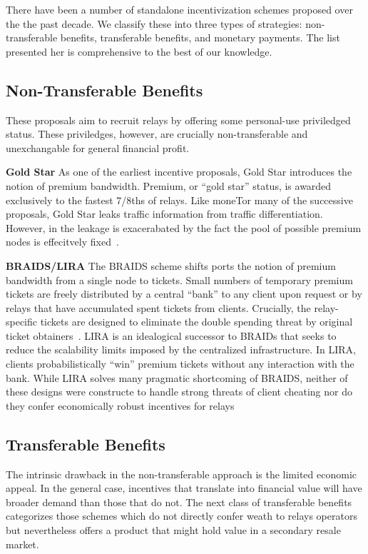There have been a number of standalone incentivization schemes proposed over the
the past decade. We classify these into three types of strategies:
non-transferable benefits, transferable benefits, and monetary payments. The
list presented her is comprehensive to the best of our knowledge.

\subsection{Non-Transferable Benefits}

These proposals aim to recruit relays by offering some personal-use priviledged
status. These priviledges, however, are crucially non-transferable and
unexchangable for general financial profit.

\textbf{Gold Star} As one of the earliest incentive proposals, Gold Star introduces the notion of
premium bandwidth. Premium, or ``gold star'' status, is awarded exclusively to
the fastest 7/8ths of relays. Like moneTor many of the successive proposals,
Gold Star leaks traffic information from traffic differentiation. However, in
the leakage is exacerabated by the fact the pool of possible premium nodes is
effecitvely fixed~\cite{dingledine2010building}.

\textbf{BRAIDS/LIRA} The BRAIDS scheme shifts ports the notion of premium
bandwidth from a single node to tickets. Small numbers of temporary premium
tickets are freely distributed by a central ``bank'' to any client upon request
or by relays that have accumulated spent tickets from clients. Crucially, the
relay-specific tickets are designed to eliminate the double spending threat by
original ticket obtainers~\cite{jansen2010recruiting}. LIRA is an idealogical
successor to BRAIDs that seeks to reduce the scalability limits imposed by the
centralized infrastructure. In LIRA, clients probabilistically ``win'' premium
tickets without any interaction with the bank. While LIRA solves many pragmatic
shortcoming of BRAIDS, neither of these designs were constructe to handle strong
threats of client cheating nor do they confer economically robust incentives for
relays~\cite{jansen2013lira}

\subsection{Transferable Benefits}

The intrinsic drawback in the non-transferable approach is the limited economic
appeal. In the general case, incentives that translate into financial value will
have broader demand than those that do not. The next class of transferable
benefits categorizes those schemes which do not directly confer weath to relays
operators but nevertheless offers a product that might hold value in a secondary
resale market.

